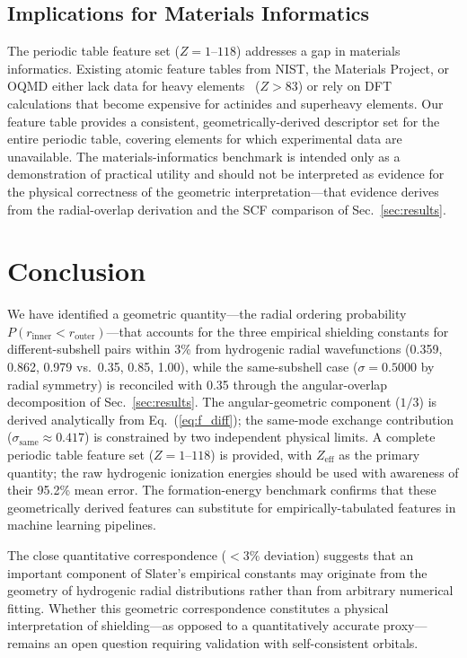 \documentclass[11pt,a4paper]{article}
\begin{document}
\subsection{Implications for Materials Informatics}

The periodic table feature set ($Z=1$--$118$) addresses a gap in materials informatics. Existing atomic feature tables from NIST, the Materials Project, or OQMD either lack data for heavy elements~\citep{zhang2018} ($Z > 83$) or rely on DFT calculations that become expensive for actinides and superheavy elements. Our feature table provides a consistent, geometrically-derived descriptor set for the entire periodic table, covering elements for which experimental data are unavailable. The materials-informatics benchmark is intended only as a demonstration of practical utility and should not be interpreted as evidence for the physical correctness of the geometric interpretation---that evidence derives from the radial-overlap derivation and the SCF comparison of Sec.~\ref{sec:results}.

\section{Conclusion}

We have identified a geometric quantity---the radial ordering probability $P(r_{\mathrm{inner}} < r_{\mathrm{outer}})$---that accounts for the three empirical shielding constants for different-subshell pairs within 3\% from hydrogenic radial wavefunctions (0.359, 0.862, 0.979 vs.\ 0.35, 0.85, 1.00), while the same-subshell case ($\sigma = 0.5000$ by radial symmetry) is reconciled with 0.35 through the angular-overlap decomposition of Sec.~\ref{sec:results}. The angular-geometric component ($1/3$) is derived analytically from Eq.~(\ref{eq:f_diff}); the same-mode exchange contribution ($\sigma_{\mathrm{same}} \approx 0.417$) is constrained by two independent physical limits. A complete periodic table feature set ($Z = 1$--$118$) is provided, with $Z_{\mathrm{eff}}$ as the primary quantity; the raw hydrogenic ionization energies should be used with awareness of their 95.2\% mean error. The formation-energy benchmark confirms that these geometrically derived features can substitute for empirically-tabulated features in machine learning pipelines.

The close quantitative correspondence ($<3\%$ deviation) suggests that an important component of Slater's empirical constants may originate from the geometry of hydrogenic radial distributions rather than from arbitrary numerical fitting. Whether this geometric correspondence constitutes a physical interpretation of shielding---as opposed to a quantitatively accurate proxy---remains an open question requiring validation with self-consistent orbitals.
\end{document}
